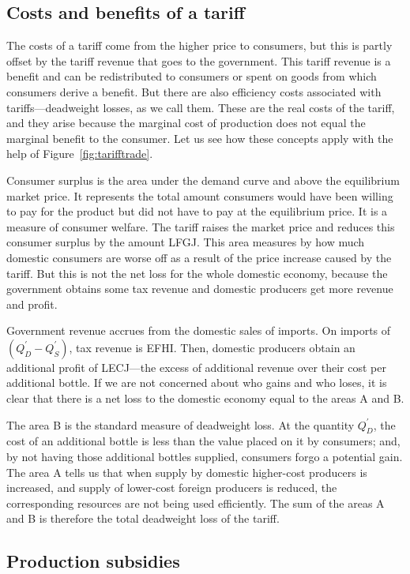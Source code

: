 \subsection*{Costs and benefits of a tariff}

The costs of a tariff come from the higher price to consumers, but this is partly offset by the tariff revenue that goes to the government. This tariff revenue is a benefit and can be redistributed to consumers or spent on goods from which consumers derive a benefit. But there are also efficiency costs associated with tariffs---deadweight losses, as we call them. These are the real costs of the tariff, and they arise because the marginal cost of production does not equal the marginal benefit to the consumer. Let us see how these concepts apply with the help of Figure~\ref{fig:tarifftrade}.

Consumer surplus is the area under the demand curve and above the equilibrium market price. It represents the total amount consumers would have been willing to pay for the product but did not have to pay at the equilibrium price. It is a measure of consumer welfare. The tariff raises the market price and reduces this consumer surplus by the amount LFGJ. This area measures by how much domestic consumers are worse off as a result of the price increase caused by the tariff. But this is not the net loss for the whole domestic economy, because the government obtains some tax revenue and domestic producers get more revenue and profit.

Government revenue accrues from the domestic sales of imports. On imports of $(Q_D^{'}-Q_S^{'})$, tax revenue is EFHI. Then, domestic producers obtain an additional profit of LECJ---the excess of additional revenue over their cost per additional bottle. If we are not concerned about who gains and who loses, it is clear that there is a net loss to the domestic economy equal to the areas A and B.

The area B is the standard measure of deadweight loss. At the quantity $Q_D^{'}$, the cost of an additional bottle is less than the value placed on it by consumers; and, by not having those additional bottles supplied, consumers forgo a potential gain. The area A tells us that when supply by domestic higher-cost producers is increased, and supply of lower-cost foreign producers is reduced, the corresponding resources are not being used efficiently. The sum of the areas A and B is therefore the total deadweight loss of the tariff.

\subsection*{Production subsidies}

